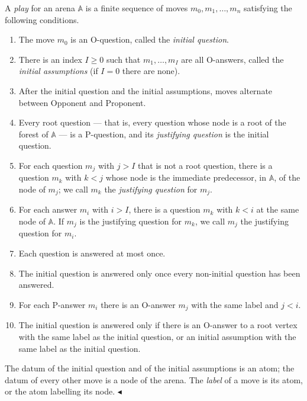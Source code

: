 \documentclass{lipics-v2021}
\newcommand{\fillBox}{\hfill$\blacktriangleleft$}
\newcommand{\arena}[1]{\mathbb{#1}}                     %
\begin{document}
\begin{definition}[Play]
\label{def:play}
A \emph{play} for an arena $\arena{A}$ is a finite sequence of moves $m_0, m_1, \ldots, m_n$ satisfying the following conditions.
    \begin{enumerate}[label=(\roman*)]
        \item The move $m_0$ is an O-question, called the \emph{initial question}.
        \item There is an index $I \ge 0$ such that $m_1, \ldots, m_I$ are all O-answers,
      called the \emph{initial assumptions} (if $I = 0$ there are none).
        \item After the initial question and the initial assumptions, moves alternate between Opponent and Proponent.
        \item Every root question --- that is, every question whose node is a root of the
      forest of $\arena{A}$ --- is a P-question, and its \emph{justifying question}
      is the initial question.
\item For each question $m_j$ with $j > I$ that is not a root question, there is a
      question $m_k$ with $k < j$ whose node is the immediate predecessor, in
      $\arena{A}$, of the node of $m_j$; we call $m_k$ the \emph{justifying
      question} for $m_j$.
        \item For each answer $m_i$ with $i > I$, there is a question $m_k$ with $k < i$ at the same node of $\arena{A}$. If $m_j$ is the justifying question for $m_k$, we call $m_j$ the justifying question for $m_i$.
        \item Each question is answered at most once.
        \item The initial question is answered only once every non-initial question has been answered.
        \item For each P-answer $m_i$ there is an O-answer $m_j$ with the same label and $j < i$.
        \item The initial question is answered only if there is an O-answer to a root vertex with the same label as the initial question, or an initial assumption with the same label as the initial question.
    \end{enumerate}
    The datum of the initial question and of the initial assumptions is an atom; the datum of every other move is a node of the arena. The \emph{label} of a move is
its atom, or the atom labelling its node. \fillBox
\end{definition}
 
\end{document}
